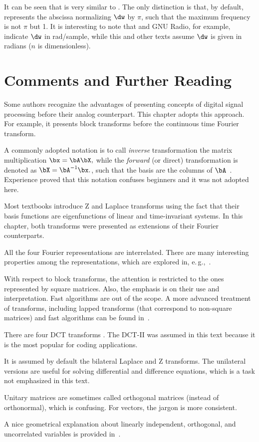 It can be seen that  is very similar to . The only distinction is that, by default, {\matlab} represents the abscissa normalizing $\dw$ by $\pi$, such that the maximum frequency is not $\pi$ but 1. It is interesting to note that {\matlab} and GNU Radio, for example, indicate $\dw$ in rad/sample, while this and other texts assume $\dw$ is given in radians ($n$ is dimensionless).
\eApplication

\section{Comments and Further Reading}

Some authors recognize the advantages of presenting  concepts of digital signal processing before their analog counterpart. This chapter adopts this approach. For example, it presents block transforms before the continuous time Fourier transform.

A commonly adopted notation is to call \emph{inverse} transformation the matrix multiplication
$
\bx = \bA \bX,
$
while the \emph{forward} (or direct) transformation is denoted as
$
\bX = \bA^{-1} \bx.
$, such that the basis are the columns of $\bA$~\cite{Malvar92}. Experience proved that this notation confuses beginners and it was not adopted here.

Most textbooks introduce Z and Laplace transforms using the fact that their basis functions are eigenfunctions of linear and time-invariant systems. In this chapter, both transforms were presented as extensions of their Fourier counterparts.

All the four Fourier representations are interrelated. There are many interesting properties among the representations, which are explored in, e.\,g.,~\cite{Oppenheim09}.

With respect to block transforms, the attention is restricted to the ones represented by square matrices. Also, the emphasis is on their use and interpretation. Fast algorithms are out of the scope. A more advanced treatment of transforms, including lapped transforms (that correspond to non-square matrices) and fast algorithms can be found in~\cite{Malvar92}.

There are four DCT transforms \cite{Rao90}. The DCT-II was assumed in this text because it is the most popular for coding applications.

It is assumed by default the bilateral Laplace and Z transforms. The unilateral versions are useful for solving differential and difference equations, which is a task not emphasized in this text.

Unitary matrices are sometimes called orthogonal matrices (instead of orthonormal), which is confusing. For vectors, the jargon is more consistent.

A nice geometrical explanation about linearly independent, orthogonal, and uncorrelated variables is
provided in~\cite{Rodgers84}.

